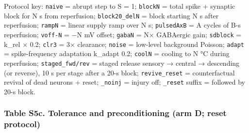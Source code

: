 \documentclass[11pt]{article}
\begin{document}
Protocol key: \texttt{naive} = abrupt step to S = 1; \texttt{blockN} = total spike + synaptic block for N s from reperfusion; \texttt{block20\_delN} = block starting N s after reperfusion; \texttt{rampN} = linear supply ramp over N s; \texttt{pulsedAxB} = A cycles of B-s reperfusion; \texttt{voff-N} = −N mV offset; \texttt{gabaN} = N× GABAergic gain; \texttt{sdblock} = k\_rel × 0.2; \texttt{clr3} = 3× clearance; \texttt{noise} = low-level background Poisson; \texttt{adapt} = spike-frequency adaptation k\_adapt 0.2; \texttt{coolN} = cooling to N °C during reperfusion; \texttt{staged\_fwd/rev} = staged release sensory → central → descending (or reverse), 10 s per stage after a 20-s block; \texttt{revive\_reset} = counterfactual revival of dead neurons + reset; \texttt{\_noinj} = injury off; \texttt{\_reset} suffix = followed by 20-s block.

\subsubsection{Table S5c. Tolerance and preconditioning (arm D; reset protocol)}\label{table-s5c.-tolerance-and-preconditioning-arm-d-reset-protocol}
\end{document}
